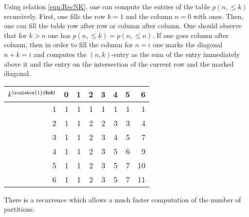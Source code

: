 

Using relation \eqref{eqn:RecNK}, one can compute the entries of the table $p(n, \le k)$ recursively.
First, one fills the row $k=1$ and the column $n=0$ with ones.
Then, one can fill the table row after row or column after column.
One should observe that for $k > n$ one has $p(n, \le k) = p(n, \le n)$.
If one goes column after column, then in order to fill the column for $n = i$
one marks the diagonal $n+k = i$ and computes the $(n,k)$-entry as the sum of the entry immediately above it
and the entry on the intersection of the current row and the marked diagonal.

\begin{center}
\begin{tabular}{r|rrrrrrr}
$k^{\scalebox{1}{$n$}}$\hspace{-.2cm} & 0 & 1 & 2 & 3 & 4 & 5 & 6\\
\hline
1 & 1 & 1 & 1 & 1 & 1 & 1 & 1\\
2 & 1 & 1 & 2 & 2 & 3 & 3 & 4\\
3 & 1 & 1 & 2 & 3 & 4 & 5 & 7\\
4 & 1 & 1 & 2 & 3 & 5 & 6 & 9\\
5 & 1 & 1 & 2 & 3 & 5 & 7 & 10\\
6 & 1 & 1 & 2 & 3 & 5 & 7 & 11
\end{tabular}
\end{center}

There is a recurrence which allows a much faster computation of the number of partitions.
